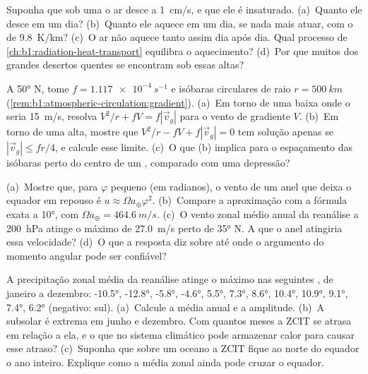 \begin{exercise}[$\star\star$]\label{exo:b1:atmospheric-circulation:9}
Suponha que sob uma  o ar desce a \qty{1}{cm/s}, e que ele é insaturado. (a)~Quanto ele
desce em um dia? (b)~Quanto ele aquece em um dia, se nada mais atuar, com o 
de \qty{9.8}{K/km}? (c)~O ar não aquece tanto assim dia após dia. Qual processo de
\cref{ch:b1:radiation-heat-transport} equilibra o aquecimento? (d)~Por que muitos dos grandes desertos
quentes se encontram sob essas altas?
\end{exercise}

\begin{exercise}[$\star\star\star$]\label{exo:b1:atmospheric-circulation:10}
A \ang{50} N, tome $f = \qty{1.117e-4}{s^{-1}}$ e isóbaras circulares de raio $r = \qty{500}{km}$
(\cref{rem:b1:atmospheric-circulation:gradient}). (a)~Em torno de uma baixa onde o 
seria \qty{15}{m/s}, resolva $V^2/r + fV =
f|\vec v_g|$ para o vento de gradiente $V$. (b)~Em torno de uma alta, mostre que $V^2/r - fV + f
|\vec v_g| = 0$ tem solução apenas se $|\vec v_g| \leq fr/4$, e calcule esse limite. (c)~O que (b)
implica para o espaçamento das isóbaras perto do centro de um , comparado com uma depressão?
\end{exercise}

\begin{exercise}[$\star\star\star$]\label{exo:b1:atmospheric-circulation:11}
(a)~Mostre que, para $\varphi$ pequeno (em radianos), o vento de um anel que deixa o equador em repouso
é $u \approx \Omega a_\oplus\varphi^2$. (b)~Compare a aproximação com a fórmula exata a \ang{10}, com
$\Omega a_\oplus = \qty{464.6}{m/s}$. (c)~O vento zonal médio anual da reanálise a \qty{200}{hPa} atinge o
máximo de \qty{27.0}{m/s} perto de \ang{35} N. A que  o anel atingiria essa velocidade? (d)~O que
a resposta diz sobre até onde o argumento do momento angular pode ser confiável?
\end{exercise}

\begin{exercise}[$\star\star\star$]\label{exo:b1:atmospheric-circulation:12}
A precipitação zonal média da reanálise atinge o máximo nas seguintes , de janeiro a
dezembro: \ang{-10.5}, \ang{-12.8}, \ang{-5.8}, \ang{-4.6}, \ang{5.5}, \ang{7.3}, \ang{8.6}, \ang{10.4},
\ang{10.9}, \ang{9.1}, \ang{7.4}, \ang{6.2} (negativo: sul). (a)~Calcule a média anual e a amplitude.
(b)~A  subsolar é extrema em junho e dezembro. Com quantos meses a ZCIT se atrasa em relação a
ela, e o que no sistema climático pode armazenar calor para causar esse atraso? (c)~Suponha que sobre um
oceano a ZCIT fique ao norte do equador o ano inteiro. Explique como a média zonal ainda pode cruzar o
equador.
\end{exercise}


